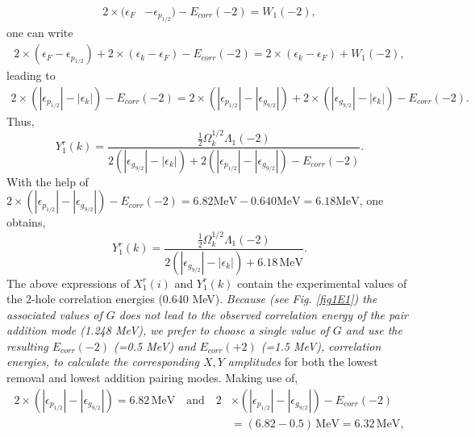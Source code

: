 \begin{equation*}
\begin{split}
2\times(\epsilon_F&-\epsilon_{p_{1/2}})-E_{corr}(-2)=W_1(-2),
\end{split}
\end{equation*}
one can write
\begin{equation*}
\begin{split}
2\times(\epsilon_F-\epsilon_{p_{1/2}})+2\times(\epsilon_k-\epsilon_{F})-E_{corr}(-2)=2\times(\epsilon_k-\epsilon_{F})+W_1(-2),
\end{split}
\end{equation*}
leading to 
\begin{equation*}
\begin{split}
2\times(|\epsilon_{p_{1/2}}|-|\epsilon_k|)-E_{corr}(-2)=2\times(|\epsilon_{p_{1/2}}|-|\epsilon_{g_{9/2}}|)+2\times(|\epsilon_{g_{9/2}}|-|\epsilon_k|)-E_{corr}(-2).
\end{split}
\end{equation*}
Thus, 
\begin{equation*}
Y_1^r(k)=\frac{\frac{1}{2}\Omega_k^{1/2}\Lambda_1(-2)}{2(|\epsilon_{g_{9/2}}|-|\epsilon_k|)+2(|\epsilon_{p_{1/2}}|-|\epsilon_{g_{9/2}}|)-E_{corr}(-2)}.
\end{equation*}
With the help of  $2\times(|\epsilon_{p_{1/2}}|-|\epsilon_{g_{9/2}}|)-E_{corr}(-2)=6.82 \text{MeV}-0.640 \text{MeV}=6.18 \text{MeV}$, one obtains,
\begin{equation}\label{eq3.5.5}
Y_1^r(k)=\frac{\frac{1}{2}\Omega_k^{1/2}\Lambda_1(-2)}{2(|\epsilon_{g_{9/2}}|-|\epsilon_k|)+6.18\,\text{MeV}}.
\end{equation}
The above  expressions of $X_1^r(i)$ and $Y_1^r(k)$ contain the experimental values of the $2$-hole correlation energies (0.640 MeV). \textit{Because (see Fig. \ref{fig1E1}) the associated values of $G$ does not lead to the observed correlation energy of the pair addition mode (1.248 MeV), we prefer to choose a single value of $G$ and use the resulting $E_{corr}(-2)$ (=0.5 MeV) and $E_{corr}(+2)$ (=1.5 MeV), correlation energies, to calculate the corresponding $X,Y$ amplitudes} for both the lowest removal and lowest addition pairing modes. Making use of, 
\begin{equation*}
\begin{split}
2\times(|\epsilon_{p_{1/2}}|-|\epsilon_{g_{9/2}}|)=6.82\,\text{MeV}\quad\text{and}\quad 2&\times(|\epsilon_{p_{1/2}}|-|\epsilon_{g_{9/2}}|)-E_{corr}(-2)\\
&=(6.82-0.5)\,\text{MeV}=6.32\,\text{MeV},
\end{split}
\end{equation*}
